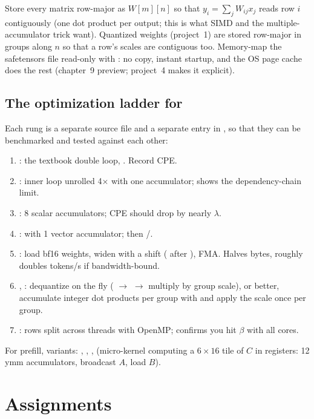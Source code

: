 Store every matrix row-major as $W[m][n]$ so that $y_i = \sum_j W_{ij} x_j$ reads row $i$ contiguously (one dot product per output; this is what SIMD and the multiple-accumulator trick want). Quantized weights (project~1) are stored row-major in groups along $n$ so that a row's scales are contiguous too. Memory-map the safetensors file read-only with : no copy, instant startup, and the OS page cache does the rest (chapter~9 preview; project~4 makes it explicit).

\subsection{The optimization ladder for }

Each rung is a separate source file and a separate entry in , so that they can be benchmarked and tested against each other:
\begin{enumerate}[label=R\arabic*.]
  \item {}: the textbook double loop, . Record CPE.
  \item {}: inner loop unrolled 4$\times$ with one accumulator; shows the dependency-chain limit.
  \item {}: $8$ scalar accumulators; CPE should drop by nearly $\lambda$.
  \item {}:  with 1 vector accumulator; then /.
  \item {}: load bf16 weights, widen with a shift ( after ), FMA. Halves bytes, roughly doubles tokens/s if bandwidth-bound.
  \item {}, : dequantize on the fly (  $\to$  $\to$ multiply by group scale), or better, accumulate integer dot products per group with  and apply the scale once per group.
  \item {}: rows split across threads with OpenMP; confirms you hit $\beta$ with all cores.
\end{enumerate}
For prefill,  variants: , , ,  (micro-kernel computing a $6\times 16$ tile of $C$ in registers: 12 ymm accumulators, broadcast $A$, load $B$).

\section{Assignments}

